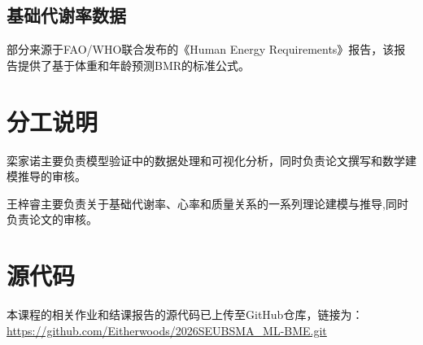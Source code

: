 \subsection*{基础代谢率数据}
部分来源于FAO/WHO联合发布的《Human Energy Requirements》报告，该报告提供了基于体重和年龄预测BMR的标准公式。

\section{分工说明}
栾家诺主要负责模型验证中的数据处理和可视化分析，同时负责论文撰写和数学建模推导的审核。
\par
王梓睿主要负责关于基础代谢率、心率和质量关系的一系列理论建模与推导,同时负责论文的审核。
\section{源代码}
本课程的相关作业和结课报告的源代码已上传至GitHub仓库，链接为：\url{https://github.com/Eitherwoods/2026SEUBSMA_ML-BME.git}
